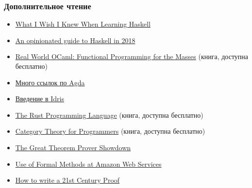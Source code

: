 \documentclass[11pt]{beamer}
\begin{document}
\begin{frame}[fragile]
  \frametitle{Дополнительное чтение}
  \begin{itemize}
    \item \href{http://dev.stephendiehl.com/hask/}{What I Wish I Knew When Learning Haskell}
    \item \href{https://lexi-lambda.github.io/blog/2018/02/10/an-opinionated-guide-to-haskell-in-2018/}{An opinionated guide to Haskell in 2018}
    \item \href{https://realworldocaml.org/}{Real World OCaml: Functional Programming for the Masses} (книга, доступна бесплатно)
    \item \href{https://wiki.portal.chalmers.se/agda/pmwiki.php?n=Main.Documentation}{Много ссылок по Agda}
    \item \href{http://docs.idris-lang.org/en/latest/tutorial/index.html}{Введение в Idris}
    \item \href{https://doc.rust-lang.org/book/}{The Rust Programming Language} (книга, доступна бесплатно)
    \item \href{https://github.com/hmemcpy/milewski-ctfp-pdf}{Category Theory for Programmers} (книга, доступна бесплатно)
    \item \href{https://www.hillelwayne.com/post/theorem-prover-showdown/}{The Great Theorem Prover Showdown}
    \item \href{https://blog.acolyer.org/2014/11/24/use-of-formal-methods-at-amazon-web-services/}{Use of Formal Methods at Amazon Web Services}
    \item \href{https://blog.acolyer.org/2015/01/12/how-to-write-a-21st-century-proof/}{How to write a 21st Century Proof}
  \end{itemize}
\end{frame}
\end{document}
